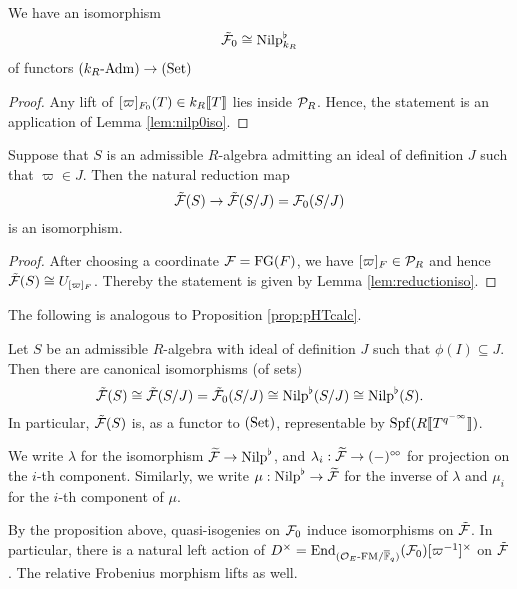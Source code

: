\documentclass[../main.tex]{subfiles}
\begin{document}
\begin{lem}
  We have an isomorphism 
  \begin{equation*}
    \tilde {\mathcal{F}}_0 \cong {\mathrm{Nilp}}^\flat_{k_R}
  \end{equation*}
  of functors ${({k_R}\text-\allowbreak\mathrm{Adm})} \to {(\mathrm{Set})}$
  \begin{proof}
    Any lift of $[\varpi]_{F_0}(T) \in k_R\llbracket T \rrbracket$ lies inside $\mathcal{P}_R$. Hence,
    the statement is an application of Lemma \ref{lem:nilp0iso}.
  \end{proof}
\end{lem}

\begin{lem}
  Suppose that $S$ is an admissible $R$-algebra admitting an ideal of definition
  $J$ such that $\varpi \in J$. Then the natural reduction map
  \begin{equation*}
    \tilde {\mathcal{F}}(S) \to \tilde {\mathcal{F}}(S/J) = \mathcal{F}_0(S/J)
  \end{equation*}
  is an isomorphism.
  \begin{proof}[Proof]
    After choosing a coordinate $\mathcal{F} = \textnormal{FG}(F)$, we have $[\varpi]_F \in \mathcal{P}_R$
    and hence $\tilde {\mathcal{F}}(S) \cong U_{[\varpi]_F}$. Thereby the statement is
    given by Lemma \ref{lem:reductioniso}.
  \end{proof}
\end{lem}

The following is analogous to Proposition \ref{prop:pHTcalc}.
\begin{prop}\label{prop:UnivCoverReductionIso}
  Let $S$ be an admissible $R$-algebra with ideal of definition $J$ such that 
  $\phi(I) \subseteq J$. Then there are canonical isomorphisms (of sets)
  \begin{equation*}
    \tilde {\mathcal{F}}(S) \cong \tilde {\mathcal{F}}(S/J) = \tilde {\mathcal{F}}_0(S/J) \cong {\mathrm{Nilp}}^\flat(S/J) \cong
    {\mathrm{Nilp}}^\flat(S).
  \end{equation*}
  In particular, $\tilde {\mathcal{F}}(S)$ is, as a functor to ${(\mathrm{Set})}$, representable by
  $\operatorname{Spf}(R \llbracket T^{q^{-\infty}} \rrbracket)$.
\end{prop}
We write $\lambda$ for the isomorphism $\widetilde{\mathcal{F}} \to {\mathrm{Nilp}}^\flat$, and
$\lambda_i: \widetilde{\mathcal{F}} \to (-)^{\circ \hspace{-0.5pt} \circ}$ for projection on the $i$-th component.
Similarly, we write $\mu: {\mathrm{Nilp}}^\flat \to \widetilde{\mathcal{F}}$ for the inverse of 
$\lambda$ and $\mu_i$ for the $i$-th component of $\mu$. 

By the proposition above, quasi-isogenies on $\mathcal{F}_0$ induce isomorphisms on 
$\tilde {\mathcal{F}}$. In particular, there is a natural left action of 
$D^\times = \operatorname{End}_{{({\mathcal{O}_E}\text-\allowbreak\mathrm{FM}/{{\overline {\mathbb{F}}_q}})}}(\mathcal{F}_0)[\varpi^{-1}]^\times$ on $\tilde {\mathcal{F}}$. 
The relative Frobenius morphism lifts as well.
\end{document}
